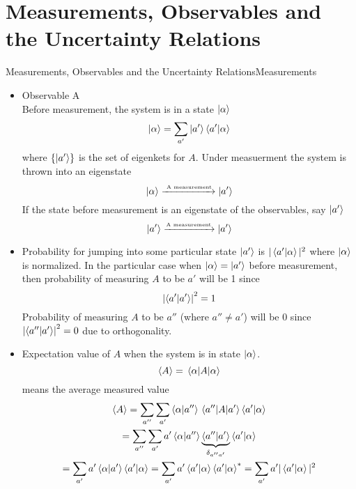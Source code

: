 \section{Measurements, Observables and the Uncertainty Relations}
\begin{frame}{Measurements, Observables and the Uncertainty Relations}{Measurements}
	\begin{itemize}
		\item Observable A \\
		      Before measurement, the system is in a state $\ket \alpha$
		      \[
			      \ket{\alpha} = \sum_{a'} \ket{a'} \ip{a'}{\alpha}
		      \]
		      where $\{\ket{a'}\}$ is the set of eigenkets for $A$. Under measuerment the system is thrown into an eigenstate
		      \[ \ket{\alpha} \xrightarrow{\text{ \tiny A measurement}} \ket{a'}\]
		      If the state before measurement is an eigenstate of the observables, say $\ket{a'}$
		      \[ \ket{a'} \xrightarrow{\text{\tiny A measurement}} \ket{a'}\]
	\end{itemize}
\end{frame}

\begin{frame}
	\begin{itemize}
		\item Probability for jumping into some particular state $\ket{a'}$ is $|\ip{a'}{\alpha}|^2$ where $\ket{\alpha}$ is normalized.
		      In the particular case when $\ket{\alpha} = \ket{a'}$ before measurement, then probability of measuring $A$ to be $a'$ will be 1 since
		      \[\qty|\ip{a'}|^2 = 1\]
		      Probability of measuring $A$ to be $a''$ (where $a'' \neq a'$) will be 0 since $\qty|\ip{a''}{a'}|^2 = 0$ due to orthogonality.
		\item Expectation value of $A$ when the system is in state $\ket \alpha$. \[\ev{A} =\ev{A}{\alpha} \]
		      means the average measured value
		      \begin{gather*}
			      \ev{A} = \sum_{a''}\sum_{a'} \ip{\alpha}{a''}\mel{a''}{A}{a'}\ip{a'}{\alpha}\\
			      = \sum_{a''}\sum_{a'} a'\ip{\alpha}{a''} \underbrace{\ip{a''}{a'}}_{\delta_{a''a'}} \ip{a'}{\alpha}\\
			      = \sum_{a'} a' \ip{\alpha}{a'}\ip{a'}{\alpha} = \sum_{a'} a' \ip{a'}{\alpha} \ip{a'}{\alpha}^* = \sum_{a'} a'|\ip{a'}{\alpha}|^2
		      \end{gather*}
	\end{itemize}
\end{frame}

